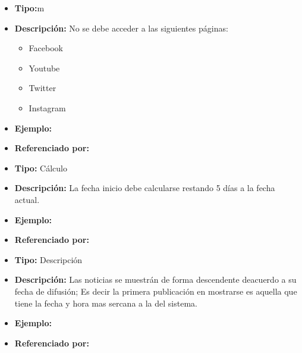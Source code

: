    \begin{itemize}
      \item \textbf{Tipo:}m
      \item \textbf{Descripción:} No se debe acceder a las siguientes páginas:
        \begin{itemize}
            \item Facebook
            \item Youtube
            \item Twitter
            \item Instagram 
        \end{itemize} 
      \item \textbf{Ejemplo:}
      \item \textbf{Referenciado por:}  \\
    \end{itemize}


    \begin{itemize}
      \item \textbf{Tipo:} Cálculo
      \item \textbf{Descripción:} La fecha inicio debe calcularse restando 5 días a la fecha actual.
      \item \textbf{Ejemplo:} 
      \item \textbf{Referenciado por:}  \\
    \end{itemize}


    \begin{itemize}
      \item \textbf{Tipo:} Descripción
      \item \textbf{Descripción:} Las noticias se muestrán de forma descendente deacuerdo a su fecha de difusión; Es decir la primera publicación en mostrarse es aquella que tiene la fecha y hora mas sercana a la del sistema.
      \item \textbf{Ejemplo:} 
      \item \textbf{Referenciado por:}  \\
    \end{itemize}
